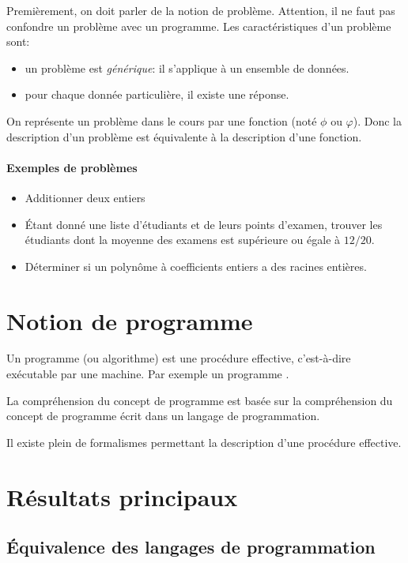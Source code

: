 Premièrement, on doit parler de la notion de problème.
Attention, il ne faut pas confondre un problème avec un programme.
Les caractéristiques d'un problème sont:

\begin{itemize}
	\item un problème est \emph{générique}: il s'applique à un ensemble de données.
	\item pour chaque donnée particulière, il existe une réponse.
\end{itemize}

On représente un problème dans le cours par une fonction (noté $\phi$ ou $\varphi$).
Donc la description d'un problème est équivalente à la description d'une fonction.

\paragraph{Exemples de problèmes}
\begin{itemize}
	\item Additionner deux entiers
	\item Étant donné une liste d'étudiants et de leurs points d'examen, trouver les étudiants dont la moyenne des examens est supérieure ou égale à $12/20$.
	\item Déterminer si un polynôme à coefficients entiers a des racines entières.
\end{itemize}

\section{Notion de programme}
\label{sec:notion_de_programme}

Un programme (ou algorithme) est une \og procédure effective\fg, c'est-à-dire exécutable par une machine. Par exemple un programme \java.

La compréhension du concept de programme est basée sur la compréhension du concept de \og programme écrit dans un langage de programmation\fg.

Il existe plein de formalismes permettant la description d'une \og procédure effective\fg.

\section{Résultats principaux}
\label{sec:r_sultat_principaux}

\subsection{Équivalence des langages de programmation}
\label{subsec:equivalence_des_langages_de_programmation}


